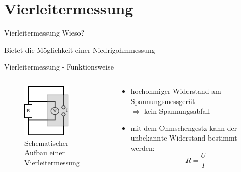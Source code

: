 \section{Vierleitermessung}

\begin{frame}{Vierleitermessung}
Wieso?
\begin{center}
Bietet die Möglichkeit einer Niedrigohmmessung
\end{center}
\end{frame}

\begin{frame}{Vierleitermessung - Funktionsweise}
 \begin{columns}
   \begin{column}{0.49\textwidth}
  \begin{figure}
    \centering
    \includegraphics[width=0.7\textwidth]{bilder/vp_1.pdf}
    \caption{Schematischer Aufbau einer Vierleitermessung}
    \label{fig: versuchsaufbau}
  \end{figure}
\end{column}
\begin{column}{0.49\textwidth}
  \begin{itemize}
    \item {hochohmiger Widerstand am Spannungsmessgerät \\
          $\Rightarrow$ kein Spannungsabfall \\ \hfill }
\item{ mit dem Ohmschengestz kann der unbekannte Widerstand bestimmt werden:
\begin{equation*}
  R=\frac{U}{I}
\end{equation*}}
\end{itemize}
\end{column}
\end{columns}
\end{frame}
